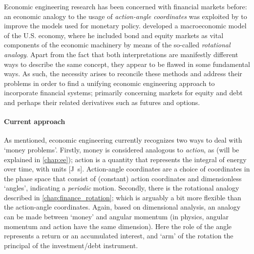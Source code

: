Economic engineering research has been concerned with financial markets before: an economic analogy to the usage of 
\emph{action-angle coordinates} was exploited by \citet{Vos2019} to improve the models used for monetary policy. \citet{Kruimer2021} developed a macroeconomic model of the U.S. economy, where he included bond and equity markets as vital components of the economic machinery by means of the so-called \emph{rotational analogy}. Apart from the fact that both interpretations are manifestly different ways to describe the same concept, they appear to be flawed in some fundamental ways. As such, the necessity arises to reconcile these methods and address their problems in order to find a unifying economic engineering approach to incorporate financial systems; primarily concerning markets for equity and debt and perhaps their related derivatives such as futures and options. 

\paragraph{Current approach} As mentioned, economic engineering currently recognizes two ways to deal with 
`money problems'. Firstly, money is considered analogous to \emph{action}, as (will be explained in \cref{chap:ee}); action is a quantity that represents the integral of energy over time, with units [\si{\joule \second}]. Action-angle coordinates are a choice of coordinates in the phase space that consist of (constant) action coordinates and dimensionless `angles', indicating a \emph{periodic} motion. Secondly, there is the rotational analogy described in \cref{chap:finance_rotation}; which is arguably a bit more flexible than the action-angle coordinates. Again, based on dimensional analysis, an analogy can be made between `money' and angular momentum (in physics, angular momentum and action have the same dimension). Here the role of the angle represents a return or an accumulated interest, and `arm' of the rotation the principal of the investment/debt instrument.

